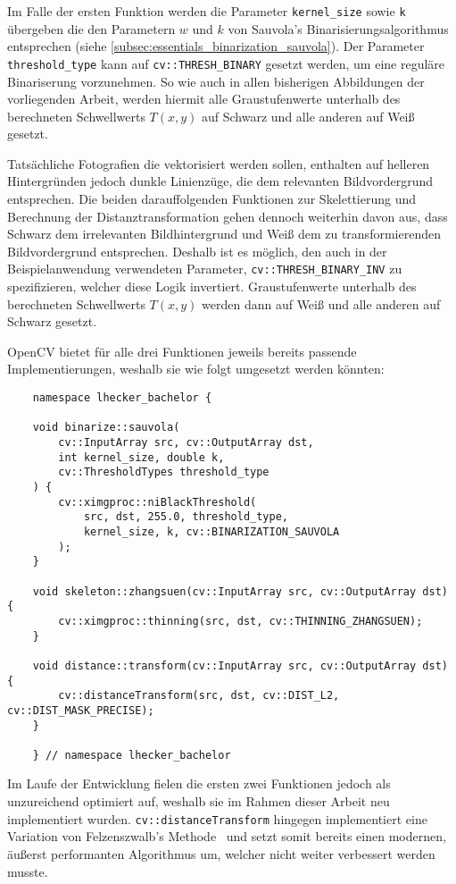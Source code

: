 Im Falle der ersten Funktion werden die Parameter \texttt{kernel\_size} sowie \texttt{k} übergeben die den Parametern \(w\) und \(k\) von Sauvola's Binarisierungsalgorithmus entsprechen (siehe \autoref{subsec:essentials_binarization_sauvola}).
Der Parameter \texttt{threshold\_type} kann auf \texttt{cv::THRESH\_BINARY} gesetzt werden, um eine reguläre Binariserung vorzunehmen.
So wie auch in allen bisherigen Abbildungen der vorliegenden Arbeit, werden hiermit alle Graustufenwerte unterhalb des berechneten Schwellwerts \(T(x,y)\) auf Schwarz und alle anderen auf Weiß gesetzt.

Tatsächliche Fotografien die vektorisiert werden sollen, enthalten auf helleren Hintergründen jedoch dunkle Linienzüge, die dem relevanten Bildvordergrund entsprechen.
Die beiden darauffolgenden Funktionen zur Skelettierung und Berechnung der Distanztransformation gehen dennoch weiterhin davon aus, dass Schwarz dem irrelevanten Bildhintergrund und Weiß dem zu transformierenden Bildvordergrund entsprechen.
Deshalb ist es möglich, den auch in der Beispielanwendung verwendeten Parameter, \texttt{cv::THRESH\_BINARY\_INV} zu spezifizieren, welcher diese Logik invertiert.
Graustufenwerte unterhalb des berechneten Schwellwerts \(T(x,y)\) werden dann auf Weiß und alle anderen auf Schwarz gesetzt.

OpenCV bietet für alle drei Funktionen jeweils bereits passende Implementierungen, weshalb sie wie folgt umgesetzt werden könnten:
\begin{verbatim}
    namespace lhecker_bachelor {

    void binarize::sauvola(
        cv::InputArray src, cv::OutputArray dst,
        int kernel_size, double k,
        cv::ThresholdTypes threshold_type
    ) {
        cv::ximgproc::niBlackThreshold(
            src, dst, 255.0, threshold_type,
            kernel_size, k, cv::BINARIZATION_SAUVOLA
        );
    }

    void skeleton::zhangsuen(cv::InputArray src, cv::OutputArray dst) {
        cv::ximgproc::thinning(src, dst, cv::THINNING_ZHANGSUEN);
    }

    void distance::transform(cv::InputArray src, cv::OutputArray dst) {
        cv::distanceTransform(src, dst, cv::DIST_L2, cv::DIST_MASK_PRECISE);
    }

    } // namespace lhecker_bachelor
\end{verbatim}

Im Laufe der Entwicklung fielen die ersten zwei Funktionen jedoch als unzureichend optimiert auf, weshalb sie im Rahmen dieser Arbeit neu implementiert wurden.
\texttt{cv::distanceTransform} hingegen implementiert eine Variation von Felzenszwalb's Methode~\cite{DBLP:journals/toc/FelzenszwalbH12} und setzt somit bereits einen modernen, äußerst performanten Algorithmus um, welcher nicht weiter verbessert werden musste.

